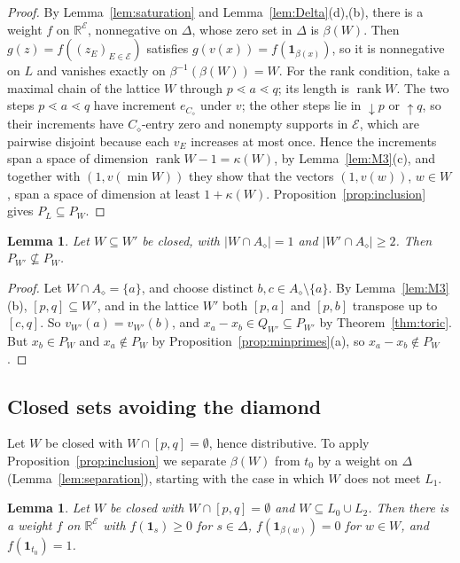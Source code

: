 \documentclass{amsart}
\newtheorem{lemma}[theorem]{Lemma}
\theoremstyle{definition}
\DeclareMathOperator{\rk}{rank}
\newcommand{\cE}{\mathcal E}
\newcommand{\R}{\mathbb R}
\newcommand{\one}{\mathbf 1}
\newcommand{\dm}{\diamond}
\begin{document}
\begin{proof}
By Lemma~\ref{lem:saturation} and Lemma~\ref{lem:Delta}(d),(b), there is a weight $f$ on $\R^\cE$, nonnegative on $\Delta$, whose zero set in $\Delta$ is $\beta(W)$. Then $g(z)=f((z_E)_{E\in\cE})$ satisfies $g(v(x))=f(\one_{\beta(x)})$, so it is nonnegative on $L$ and vanishes exactly on $\beta^{-1}(\beta(W))=W$. For the rank condition, take a maximal chain of the lattice $W$ through $p\lessdot a\lessdot q$; its length is $\rk W$. The two steps $p\lessdot a\lessdot q$ have increment $e_{C_\dm}$ under $v$; the other steps lie in ${\downarrow}p$ or ${\uparrow}q$, so their increments have $C_\dm$-entry zero and nonempty supports in $\cE$, which are pairwise disjoint because each $v_E$ increases at most once. Hence the increments span a space of dimension $\rk W-1=\kappa(W)$, by Lemma~\ref{lem:M3}(c), and together with $(1,v(\min W))$ they show that the vectors $(1,v(w))$, $w\in W$, span a space of dimension at least $1+\kappa(W)$. Proposition~\ref{prop:inclusion} gives $P_L\subseteq P_W$.
\end{proof}

\begin{lemma}\label{lem:oneatom}
Let $W\subseteq W'$ be closed, with $|W\cap A_\dm|=1$ and $|W'\cap A_\dm|\ge2$. Then $P_{W'}\not\subseteq P_W$.
\end{lemma}

\begin{proof}
Let $W\cap A_\dm=\{a\}$, and choose distinct $b,c\in A_\dm\setminus\{a\}$. By Lemma~\ref{lem:M3}(b), $[p,q]\subseteq W'$, and in the lattice $W'$ both $[p,a]$ and $[p,b]$ transpose up to $[c,q]$. So $v_{W'}(a)=v_{W'}(b)$, and $x_a-x_b\in Q_{W'}\subseteq P_{W'}$ by Theorem~\ref{thm:toric}. But $x_b\in P_W$ and $x_a\notin P_W$ by Proposition~\ref{prop:minprimes}(a), so $x_a-x_b\notin P_W$.
\end{proof}

\subsection{Closed sets avoiding the diamond}
Let $W$ be closed with $W\cap[p,q]=\emptyset$, hence distributive. To apply Proposition~\ref{prop:inclusion} we separate $\beta(W)$ from $t_0$ by a weight on $\Delta$ (Lemma~\ref{lem:separation}), starting with the case in which $W$ does not meet $L_1$.

\begin{lemma}\label{lem:outer}
Let $W$ be closed with $W\cap[p,q]=\emptyset$ and $W\subseteq L_0\cup L_2$. Then there is a weight $f$ on $\R^\cE$ with $f(\one_s)\ge0$ for $s\in\Delta$, $f(\one_{\beta(w)})=0$ for $w\in W$, and $f(\one_{t_0})=1$.
\end{lemma}
\end{document}
